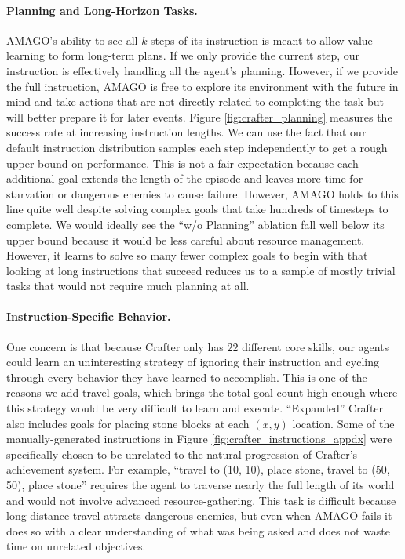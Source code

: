 \documentclass{article}
\begin{document}
\paragraph{Planning and Long-Horizon Tasks.} AMAGO's ability to see all $k$ steps of its instruction is meant to allow value learning to form long-term plans. If we only provide the current step, our instruction is effectively handling all the agent's planning. However, if we provide the full instruction, AMAGO is free to explore its environment with the future in mind and take actions that are not directly related to completing the task but will better prepare it for later events. Figure \ref{fig:crafter_planning} measures the success rate at increasing instruction lengths. We can use the fact that our default instruction distribution samples each step independently to get a rough upper bound on performance. This is not a fair expectation because each additional goal extends the length of the episode and leaves more time for starvation or dangerous enemies to cause failure. However, AMAGO holds to this line quite well despite solving complex goals that take hundreds of timesteps to complete. We would ideally see the ``w/o Planning'' ablation fall well below its upper bound because it would be less careful about resource management. However, it learns to solve so many fewer complex goals to begin with that looking at long instructions that succeed reduces us to a sample of mostly trivial tasks that would not require much planning at all.
\paragraph{Instruction-Specific Behavior.} One concern is that because Crafter only has $22$ different core skills, our agents could learn an uninteresting strategy of ignoring their instruction and cycling through every behavior they have learned to accomplish. This is one of the reasons we add travel goals, which brings the total goal count high enough where this strategy would be very difficult to learn and execute. ``Expanded'' Crafter also includes goals for placing stone blocks at each $(x, y)$ location. Some of the manually-generated instructions in Figure \ref{fig:crafter_instructions_appdx} were specifically chosen to be unrelated to the natural progression of Crafter's achievement system. For example, ``travel to (10, 10), place stone, travel to (50, 50), place stone'' requires the agent to traverse nearly the full length of its world and would not involve advanced resource-gathering. This task is difficult because long-distance travel attracts dangerous enemies, but even when AMAGO fails it does so with a clear understanding of what was being asked and does not waste time on unrelated objectives.
\end{document}
